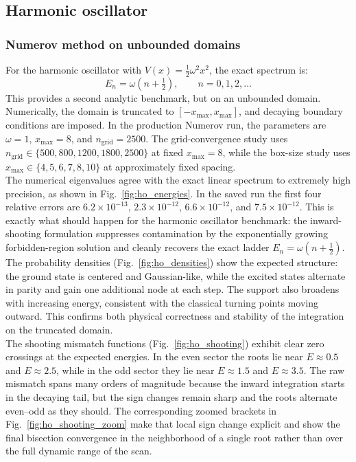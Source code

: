\documentclass[11pt]{article}
\begin{document}
\begin{refsection}
        \subsection{Harmonic oscillator}
            \subsubsection{Numerov method on unbounded domains}
                For the harmonic oscillator with $V(x)=\tfrac{1}{2}\omega^2 x^2$, the exact spectrum is:
                \begin{equation}
                E_n = \omega\left(n+\tfrac{1}{2}\right), \qquad n=0,1,2,\ldots
                \end{equation}
                This provides a second analytic benchmark, but on an unbounded domain. Numerically, the domain is truncated to $[-x_{\max},x_{\max}]$, and decaying boundary conditions are imposed. In the production Numerov run, the parameters are $\omega=1$, $x_{\max}=8$, and $n_{\text{grid}}=2500$. The grid-convergence study uses $n_{\text{grid}}\in\{500,800,1200,1800,2500\}$ at fixed $x_{\max}=8$, while the box-size study uses $x_{\max}\in\{4,5,6,7,8,10\}$ at approximately fixed spacing. \\

                The numerical eigenvalues agree with the exact linear spectrum to extremely high precision, as shown in Fig.~\ref{fig:ho_energies}. In the saved run the first four relative errors are $6.2\times10^{-13}$, $2.3\times10^{-12}$, $6.6\times10^{-12}$, and $7.5\times10^{-12}$. This is exactly what should happen for the harmonic oscillator benchmark: the inward-shooting formulation suppresses contamination by the exponentially growing forbidden-region solution and cleanly recovers the exact ladder $E_n=\omega(n+\tfrac12)$. \\

                The probability densities (Fig.~\ref{fig:ho_densities}) show the expected structure: the ground state is centered and Gaussian-like, while the excited states alternate in parity and gain one additional node at each step. The support also broadens with increasing energy, consistent with the classical turning points moving outward. This confirms both physical correctness and stability of the integration on the truncated domain. \\

                The shooting mismatch functions (Fig.~\ref{fig:ho_shooting}) exhibit clear zero crossings at the expected energies. In the even sector the roots lie near $E\approx0.5$ and $E\approx2.5$, while in the odd sector they lie near $E\approx1.5$ and $E\approx3.5$. The raw mismatch spans many orders of magnitude because the inward integration starts in the decaying tail, but the sign changes remain sharp and the roots alternate even--odd as they should. The corresponding zoomed brackets in Fig.~\ref{fig:ho_shooting_zoom} make that local sign change explicit and show the final bisection convergence in the neighborhood of a single root rather than over the full dynamic range of the scan. \\


\end{refsection}
\end{document}
